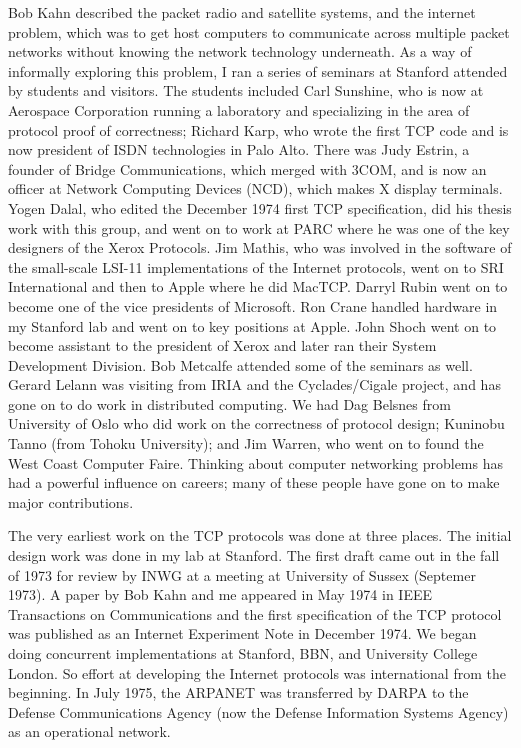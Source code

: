 \documentclass[10pt,a4paper]{scrartcl}
\begin{document}
Bob Kahn described the packet radio and satellite systems, and the internet problem, which was to get host computers to communicate across multiple packet networks without knowing the network technology underneath. As a way of informally exploring this problem, I ran a series of seminars at Stanford attended by students and visitors. The students included Carl Sunshine, who is now at Aerospace Corporation running a laboratory and specializing in the area of protocol proof of correctness; Richard Karp, who wrote the first TCP code and is now president of ISDN technologies in Palo Alto. There was Judy Estrin, a founder of Bridge Communications, which merged with 3COM, and is now an officer at Network Computing Devices (NCD), which makes X display terminals. Yogen Dalal, who edited the December 1974 first TCP specification, did his thesis work with this group, and went on to work at PARC where he was one of the key designers of the Xerox Protocols. Jim Mathis, who was involved in the software of the small-scale LSI-11 implementations of the Internet protocols, went on to SRI International and then to Apple where he did MacTCP. Darryl Rubin went on to become one of the vice presidents of Microsoft. Ron Crane handled hardware in my Stanford lab and went on to key positions at Apple. John Shoch went on to become assistant to the president of Xerox and later ran their System Development Division. Bob Metcalfe attended some of the seminars as well. Gerard Lelann was visiting from IRIA and the Cyclades/Cigale project, and has gone on to do work in distributed computing. We had Dag Belsnes from University of Oslo who did work on the correctness of protocol design; Kuninobu Tanno (from Tohoku University); and Jim Warren, who went on to found the West Coast Computer Faire. Thinking about computer networking problems has had a powerful influence on careers; many of these people have gone on to make major contributions.

The very earliest work on the TCP protocols was done at three places. The initial design work was done in my lab at Stanford. The first draft came out in the fall of 1973 for review by INWG at a meeting at University of Sussex (Septemer 1973). A paper by Bob Kahn and me appeared in May 1974 in IEEE Transactions on Communications and the first specification of the TCP protocol was published as an Internet Experiment Note in December 1974. We began doing concurrent implementations at Stanford, BBN, and University College London. So effort at developing the Internet protocols was international from the beginning. In July 1975, the ARPANET was transferred by DARPA to the Defense Communications Agency (now the Defense Information Systems Agency) as an operational network.
\end{document}
